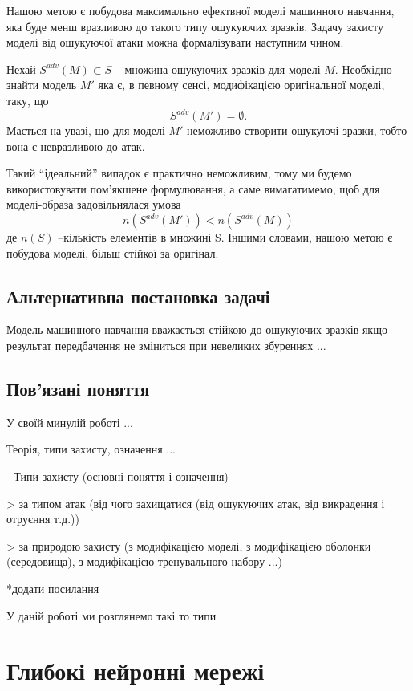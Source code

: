\documentclass[14pt,a4paper]{extarticle}
\newcounter{e}
\numberwithin{equation}{section}
\numberwithin{figure}{section}
\begin{document}
 Нашою метою є побудова максимально ефектвної моделі машинного навчання, яка буде менш вразливою до такого типу ошукуючих зразків. Задачу захисту моделі від ошукуючої атаки можна формалізувати наступним чином.
 
 Нехай $S^{adv}(M) \subset S$ -- множина ошукуючих зразків для моделі $M$. Необхідно знайти модель $M'$ яка є, в певному сенсі, модифікацією оригінальної моделі, таку, що
 \begin{equation}
 	S^{adv}(M') = \emptyset.
 \end{equation}
 Мається на увазі, що для моделі $M'$ неможливо створити ошукуючі зразки, тобто вона є невразливою до атак. 

 Такий ``ідеальний'' випадок є практично неможливим, тому ми будемо використовувати пом'якшене формулювання, а саме вимагатимемо, щоб для моделі-образа задовільнялася умова
 \begin{equation}
 	n(S^{adv}(M')) < n(S^{adv}(M))
 \end{equation}
 де $n(S)$ --кількість елементів в множині S. Іншими словами, нашою метою є побудова моделі, більш стійкої за оригінал.
 
 \subsection{Альтернативна постановка задачі}
 Модель машинного навчання вважається стійкою до ошукуючих зразків якщо результат передбачення не зміниться при невеликих збуреннях ...
 \subsection{Пов'язані поняття}
 У своїй минулій роботі ...
 
 Теорія, типи захисту, означення ...
 
 
  - Типи захисту (основні поняття і означення)
  
 > за типом атак (від чого захищатися (від ошукуючих атак, від викрадення і отруєння т.д.))
 
 > за природою захисту (з модифікацією моделі, з модифікацією оболонки (середовища), з модифікацією тренувального набору ...)
 
 *додати посилання
 
 
 У даній роботі ми розглянемо такі то типи
 
 
 \newpage
 \thispagestyle{empty}
 \section{Глибокі нейронні мережі}
 
\end{document}

